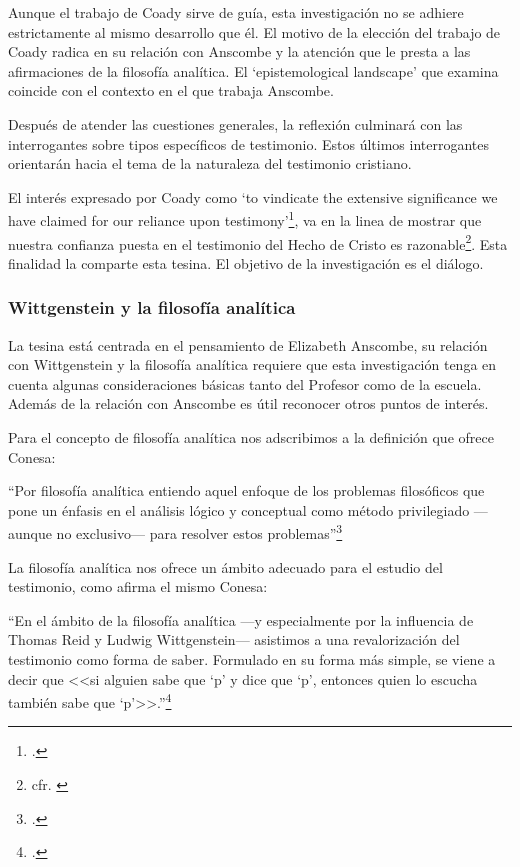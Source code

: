 \documentclass[12pt]{article}
\begin{document}
{Aunque el trabajo de Coady sirve de guía, esta investigación no se adhiere estrictamente al mismo desarrollo que él. El motivo de la elección del trabajo de Coady radica en su relación con Anscombe y la atención que le presta a las afirmaciones de la filosofía analítica. El `epistemological landscape' que examina coincide con el contexto en el que trabaja Anscombe.
 
Después de atender las cuestiones generales, la reflexión culminará con las interrogantes sobre tipos específicos de testimonio. Estos últimos interrogantes orientarán hacia el tema de la naturaleza del testimonio cristiano.

El interés expresado por Coady como `to vindicate the extensive significance we have claimed for our reliance upon testimony'\footcite{testcoady}, va en la linea de mostrar que nuestra confianza puesta en el testimonio del Hecho de Cristo es razonable\footnote{cfr. \cite[267]{pradesmulticr}}. Esta finalidad la comparte esta tesina. El objetivo de la investigación es el diálogo.

\subsubsection{Wittgenstein y la filosofía analítica}

La tesina está centrada en el pensamiento de Elizabeth Anscombe, su relación con Wittgenstein y la filosofía analítica requiere que esta investigación tenga en cuenta algunas consideraciones básicas tanto del Profesor como de la escuela. Además de la relación con Anscombe es útil reconocer otros puntos de interés.

Para el concepto de filosofía analítica nos adscribimos a la definición que ofrece Conesa:

``Por filosofía analítica entiendo aquel enfoque de los problemas filosóficos que pone un énfasis en el análisis lógico y conceptual como método privilegiado \mbox{---aunque} no \mbox{exclusivo---} para resolver estos problemas''\footcite[16]{cyc}

La filosofía analítica nos ofrece un ámbito adecuado para el estudio del testimonio, como afirma el mismo Conesa:

``En el ámbito de la filosofía analítica ---y especialmente por la influencia de Thomas Reid y Ludwig Wittgenstein--- asistimos a una revalorización del testimonio como forma de saber. Formulado en su forma más simple, se viene a decir que <<si alguien sabe que `p' y dice que `p', entonces quien lo escucha también sabe que `p'>>.''\footcite[487]{feylogicaconesa}

}
\end{document}
